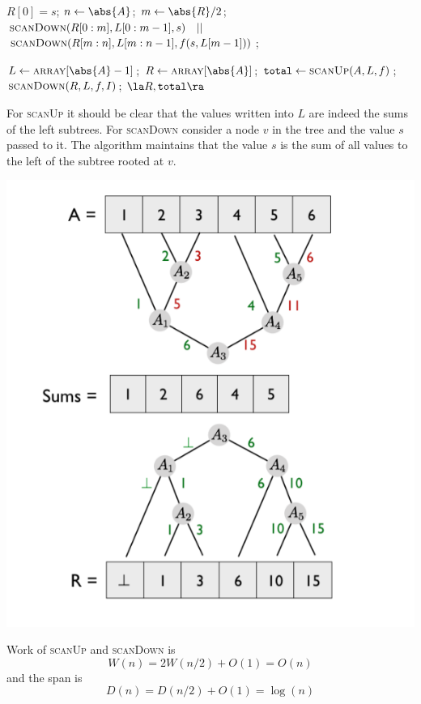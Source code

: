 \documentclass[11pt]{article}
\begin{document}
\begin{algorithmic}
                \State \(R[0]=s\);
                \State \Return
        \Else
                \State \(n\gets\abs{A}\);
                \State \(m\gets\abs{R}/2\);
                \State \(\textsc{scanDown}(R[0:m],L[0:m-1],s)\quad||\)
                \State \(\textsc{scanDown}(R[m:n],L[m:n-1],f(s,L[m-1]))\);
                \State \Return
        \EndIf
\EndFunction
\end{algorithmic}

\begin{algorithmic}
\State \(L\gets\textsc{array}[\abs{A}-1]\);
\State \(R\gets\textsc{array}[\abs{A}]\);
\State \(\texttt{total}\gets\textsc{scanUp}(A,L,f)\);
\State \(\textsc{scanDown}(R,L,f,I)\);
\State\Return \(\la R,\texttt{total}\ra\)
\EndFunction
\end{algorithmic}

For \textsc{scanUp} it should be clear that the values written into \(L\) are indeed the sums of the
left subtrees. For \textsc{scanDown} consider a node \(v\) in the tree and the value \(s\) passed to
it. The algorithm maintains that the value \(s\) is the sum of all values to the left of the subtree
rooted at \(v\).

\begin{center}
\includegraphics[width=.8\textwidth]{../images/Parallel/1.png}
\label{}
\end{center}
Work of \textsc{scanUp} and \textsc{scanDown} is
\begin{equation*}
W(n)=2W(n/2)+O(1)=O(n)
\end{equation*}
and the span is
\begin{equation*}
D(n)=D(n/2)+O(1)=\log(n)
\end{equation*}
\end{document}
